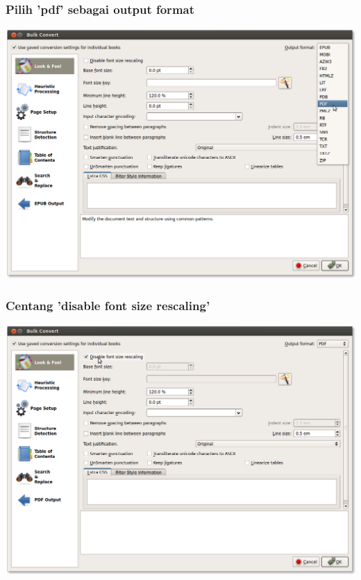 \documentclass[11pt]{beamer}
\begin{document}
\begin{frame}[shrink=20]
\frametitle{Pilih 'pdf' sebagai output format}
\includegraphics[width=\paperwidth]{graphic/choose_pdf.png}
\end{frame}


\begin{frame}[shrink=20]
\frametitle{Centang 'disable font size rescaling'}
\includegraphics[width=\paperwidth]{graphic/disable_rescaling.png}
\end{frame}
\end{document}
